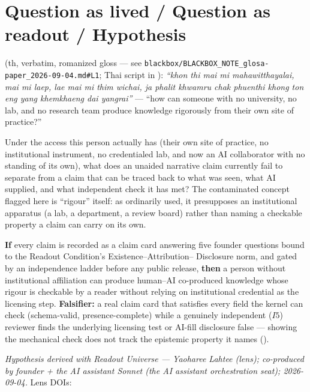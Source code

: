 \documentclass[11pt]{article}
\begin{document}
\section{Question as lived / Question as readout / Hypothesis}
\label{sec:question-lens}
\begin{description}[style=nextline,leftmargin=1.4em,font=\bfseries]
  \item[Question as lived] (th, verbatim, romanized gloss --- see
    \texttt{blackbox/BLACKBOX\_NOTE\_glosa-paper\_2026-09-04.md\#L1}; Thai script in
    ): \emph{``khon thi mai mi mahawitthayalai, mai mi laep, lae mai mi thim
    wichai, ja phalit khwamru chak phuenthi khong ton eng yang khemkhaeng dai yangrai''} ---
    ``how can someone with no university, no lab, and no research team produce knowledge
    rigorously from their own site of practice?''
  \item[Question as readout] Under the access this person actually has (their own site of
    practice, no institutional instrument, no credentialed lab, and now an AI collaborator with
    no standing of its own), what does an unaided narrative claim currently fail to separate from
    a claim that can be traced back to what was seen, what AI supplied, and what independent check
    it has met? The contaminated concept flagged here is ``rigour'' itself: as ordinarily used, it
    presupposes an institutional apparatus (a lab, a department, a review board) rather than
    naming a checkable property a claim can carry on its own.
  \item[Hypothesis (H0, governing this paper)] \textbf{If} every claim is recorded as a claim card
    answering five founder questions bound to the Readout Condition's Existence--Attribution--
    Disclosure norm, and gated by an independence ladder before any public release, \textbf{then} a
    person without institutional affiliation can produce human--AI co-produced knowledge whose
    rigour is checkable by a reader without relying on institutional credential as the licensing
    step. \textbf{Falsifier:} a real claim card that satisfies every field the kernel can check
    (schema-valid, presence-complete) while a genuinely independent ($I5$) reviewer finds the
    underlying licensing test or AI-fill disclosure false --- showing the mechanical check does not
    track the epistemic property it names ().
\end{description}
\emph{Hypothesis derived with Readout Universe --- Yaoharee Lahtee (lens); co-produced by founder +
the AI assistant Sonnet (the AI assistant orchestration seat); 2026-09-04.} Lens DOIs:
\end{document}
